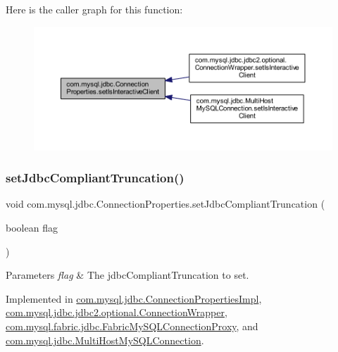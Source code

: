 Here is the caller graph for this function\+:\nopagebreak
\begin{figure}[H]
\begin{center}
\leavevmode
\includegraphics[width=350pt]{interfacecom_1_1mysql_1_1jdbc_1_1_connection_properties_a8157f1dda8d47aca668811bb7c932ec0_icgraph}
\end{center}
\end{figure}
\mbox{\label{interfacecom_1_1mysql_1_1jdbc_1_1_connection_properties_aa770c64e002c6ab1cb335107d0380476}} 
\subsubsection{\texorpdfstring{set\+Jdbc\+Compliant\+Truncation()}{setJdbcCompliantTruncation()}}
{\footnotesize\ttfamily void com.\+mysql.\+jdbc.\+Connection\+Properties.\+set\+Jdbc\+Compliant\+Truncation (\begin{DoxyParamCaption}\item[{boolean}]{flag }\end{DoxyParamCaption})}


\begin{DoxyParams}{Parameters}
{\em flag} & The jdbc\+Compliant\+Truncation to set. \\
\hline
\end{DoxyParams}


Implemented in \mbox{\hyperlink{classcom_1_1mysql_1_1jdbc_1_1_connection_properties_impl_a32bf4d4210996a1759f6a350e9c3689a}{com.\+mysql.\+jdbc.\+Connection\+Properties\+Impl}}, \mbox{\hyperlink{classcom_1_1mysql_1_1jdbc_1_1jdbc2_1_1optional_1_1_connection_wrapper_ac6acbc9e9f58e73211256f68e7f36a9a}{com.\+mysql.\+jdbc.\+jdbc2.\+optional.\+Connection\+Wrapper}}, \mbox{\hyperlink{classcom_1_1mysql_1_1fabric_1_1jdbc_1_1_fabric_my_s_q_l_connection_proxy_a24963d3cf82b5ec8579ba3e5a75fbb8b}{com.\+mysql.\+fabric.\+jdbc.\+Fabric\+My\+S\+Q\+L\+Connection\+Proxy}}, and \mbox{\hyperlink{classcom_1_1mysql_1_1jdbc_1_1_multi_host_my_s_q_l_connection_a21f38ef972c4b59de2b93cdc7549d634}{com.\+mysql.\+jdbc.\+Multi\+Host\+My\+S\+Q\+L\+Connection}}.

